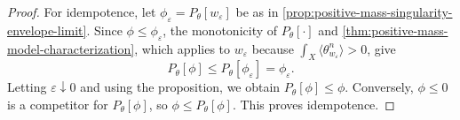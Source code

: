\begin{proof}
For idempotence, let $\phi_\varepsilon=P_\theta[w_\varepsilon]$ be as in \cref{prop:positive-mass-singularity-envelope-limit}. Since $\phi\leq\phi_\varepsilon$, the monotonicity of $P_\theta[\cdot]$ and \cref{thm:positive-mass-model-characterization}, which applies to $w_\varepsilon$ because $\int_X\langle\theta_{w_\varepsilon}^n\rangle>0$, give
\[
 P_\theta[\phi]\leq P_\theta[\phi_\varepsilon]
                                    =\phi_\varepsilon.
\]
Letting $\varepsilon\downarrow0$ and using the proposition, we obtain $P_\theta[\phi]\leq\phi$. Conversely, $\phi\leq0$ is a competitor for $P_\theta[\phi]$, so $\phi\leq P_\theta[\phi]$. This proves idempotence.
\end{proof}
